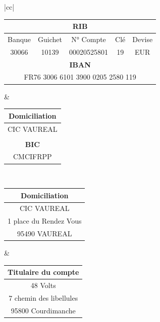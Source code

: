 \documentclass[11pt,french]{article}
\begin{document}
\begin{center}
\begin{tabular}{|cc|}
	\hline
	\begin{minipage}{10cm}
	\begin{center}
		\begin{tabular}{ccccc}
		 	\multicolumn{5}{c}{\textbf{RIB}} \\
		 	\hline
			Banque & Guichet & N° Compte & Clé & Devise \\
			30066  & 10139 & 00020525801 & 19 & EUR \\ 
			\multicolumn{5}{c}{\textbf{IBAN}} \\
			\hline
			\multicolumn{5}{c}{FR76 3006 6101 3900 0205 2580 119}
		\end{tabular}
	\end{center}
	\end{minipage} &
	\begin{minipage}{7cm}
	\begin{center}
	\begin{tabular}{c}
		\textbf{Domiciliation} \\ \hline
		CIC VAUREAL \\
		\\
		\textbf{BIC} \\ \hline
		CMCIFRPP
	\end{tabular}
	\end{center}
	\end{minipage} \\ \hline \hline

	\begin{minipage}{10cm}
	\begin{center}	
	\begin{tabular}{c}
		\textbf{Domiciliation} \\ \hline
		CIC VAUREAL \\
		1 place du Rendez Vous \\
		95490 VAUREAL
	\end{tabular}
	\end{center}
	\end{minipage} &
	\begin{minipage}{7cm}
	\begin{center}
	\begin{tabular}{c}
	\textbf{Titulaire du compte} \\ \hline
	48 Volts \\
	7 chemin des libellules \\
	95800 Courdimanche
	\end{tabular}
	\end{center}
	\end{minipage}	 \\
	\hline			
\end{tabular}
\end{center}
\end{document}
